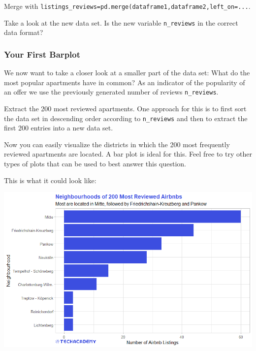 \documentclass[
  11pt,
]{article}
\newenvironment{tipsp}[1]
  {
  \begin{itemize}
  \footnotesize
  \renewcommand{\labelitemi}{
    \raisebox{-.7\height}[0pt][0pt]{
      {\setkeys{Gin}{width=3em,keepaspectratio}
        \texttt{[image: images/\#1.png]}}
    }
  }
  \setlength{\fboxsep}{1em}
  \begin{pbox}
  \item
  }
  {
  \end{pbox}
  \end{itemize}
  }
\begin{document}
\begin{tipsp}p

Merge with \texttt{listings\_reviews=pd.merge(dataframe1,dataframe2,left\_on=...}.

\end{tipsp}

Take a look at the new data set. Is the new variable \texttt{n\_reviews} in the correct data format?

\hypertarget{your-first-barplot}{%
\subsubsection{Your First Barplot}\label{your-first-barplot}}

We now want to take a closer look at a smaller part of the data set: What do the most popular apartments have in common? As an indicator of the popularity of an offer we use the previously generated number of reviews \texttt{n\_reviews}.

Extract the 200 most reviewed apartments. One approach for this is to first sort the data set in descending order according to \texttt{n\_reviews} and then to extract the first 200 entries into a new data set.

Now you can easily visualize the districts in which the 200 most frequently reviewed apartments are located. A bar plot is ideal for this. Feel free to try other types of plots that can be used to best answer this question.

This is what it could look like:

\begin{center}\includegraphics[width=1\linewidth]{plot/3_3_Barplot_MostReviewed} \end{center}
\end{document}
